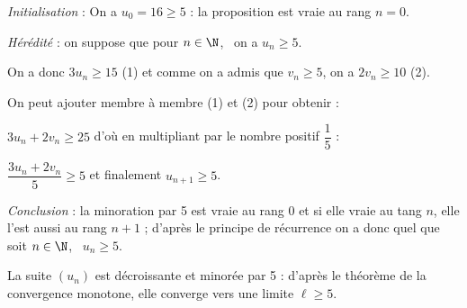 \begin{enumerate}
\begin{enumerate}[resume]
\emph{Initialisation } : On a $u_0 = 16 \geqslant 5$ : la proposition est vraie au rang $n = 0$.

\emph{Hérédité} : on suppose que pour $n \in \N$, \, on a $u_n \geqslant 5$.

On a donc $3u_n \geqslant 15$ (1) et comme on a admis que $v_n \geqslant 5$, on a $2v_n \geqslant 10$ (2).

On peut ajouter membre à membre (1) et (2) pour obtenir :

$3u_n + 2v_n \geqslant 25$ d'où en multipliant par le nombre positif $\dfrac{1}{5}$ :

$\dfrac{3u_n + 2v_n}{5} \geqslant 5$ et finalement $u_{n+1} \geqslant 5$.

\emph{Conclusion } : la minoration par 5 est vraie au rang 0 et si elle vraie au tang $n$, elle l'est aussi au rang $n + 1$ ; d'après le principe de récurrence on a donc quel que soit $n \in \N$, \, $u_n \geqslant 5$.


La suite $\left(u_n\right)$ est décroissante et minorée par 5 : d'après le théorème de la convergence monotone,  elle converge  vers une limite $\ell \geqslant 5$.
	\end{enumerate}
\end{enumerate}
	
